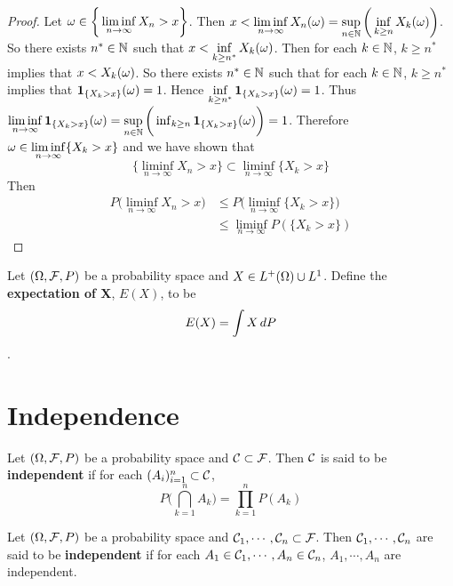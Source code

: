 \documentclass{book}
\begin{document}
	\begin{proof}
		Let $\omega \in \bigg \{ \liminf\limits_{n \rightarrow \infty} X_n > x \bigg \}$. Then $x< \liminf\limits_{n \rightarrow \infty} X_n (\omega) = \sup\limits_{n \in \mathbb{N}} \bigg( \inf\limits_{k \geq n} X_k(\omega)\bigg)$. So there exists $n^* \in \mathbb{N}$ such that $x< \inf\limits_{k \geq n^*} X_k(\omega)$. Then for each $k \in \mathbb{N}$, $k \geq n^*$ implies that $x < X_k(\omega)$. So there exists $n^* \in \mathbb{N}$ such that for each $k \in \mathbb{N}$, $k \geq n^*$ implies that $\mathbf{1}_{\{X_k > x\}}(\omega) =1$. Hence $\inf\limits_{k \geq n^*} \mathbf{1}_{\{X_k > x\}}(\omega)  = 1$. Thus  $\liminf\limits_{n \rightarrow \infty} \mathbf{1}_{\{X_k > x\}}(\omega) = \sup\limits_{n \in \mathbb{N}} \bigg( \inf_{k \geq n} \mathbf{1}_{\{X_k > x\}}(\omega) \bigg) = 1$. Therefore $\omega \in \liminf\limits_{n \rightarrow \infty} \{X_k > x\}$ and we have shown that $$\bigg \{ \liminf\limits_{n \rightarrow \infty} X_n > x \bigg \} \subset \liminf\limits_{n \rightarrow \infty} \{X_k > x\}$$ Then 
		\begin{align*}
			P \bigg( \liminf\limits_{n \rightarrow \infty} X_n > x \bigg)
			& \leq P \bigg( \liminf\limits_{n \rightarrow \infty} \{X_k > x\} \bigg) \\
			& \leq \liminf_{n \rightarrow \infty} P(\{X_k > x\})
		\end{align*}
	\end{proof}
	
	
	\begin{defn}
		Let $(\Omega, \mathcal{F}, P)$ be a probability space and $X \in L^+(\Omega) \cup L^1$. Define the \textbf{expectation of X}, $E(X)$, to be $$E(X) = \int X \, d P$$.
	\end{defn}
	
	
	\section{Independence}
	
	\begin{defn}
		Let $(\Omega, \mathcal{F}, P)$ be a probability space and $\mathcal{C} \subset \mathcal{F}$. Then $\mathcal{C}$ is said to be \textbf{independent} if for each $(A_i)_{i=1}^n \subset \mathcal{C}$, $$P \bigg( \bigcap_{k=1}^nA_k\bigg) = \prod_{k=1}^{n}P(A_k)$$
	\end{defn}
	
	\begin{defn}
		Let $(\Omega, \mathcal{F}, P)$ be a probability space and $\mathcal{C}_1, \cdots, \mathcal{C}_n \subset \mathcal{F}$. Then $\mathcal{C}_1, \cdots, \mathcal{C}_n $ are said to be \textbf{independent} if for each $A_1 \in \mathcal{C}_1,  \cdots, A_n \in \mathcal{C}_n$, $A_1, \cdots, A_n$ are independent. 
	\end{defn}
	
\end{document}
